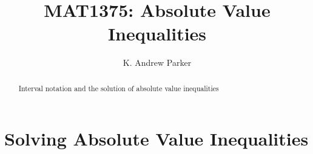 \documentclass{ximera}
\title{MAT1375: Absolute Value Inequalities}
\author{K. Andrew Parker}
\begin{document}
\begin{abstract}
Interval notation and the solution of absolute value inequalities
\end{abstract}

\maketitle

\section{Solving Absolute Value Inequalities}


\begin{center}
\end{center}

\begin{center}
\end{center}
\end{document}
